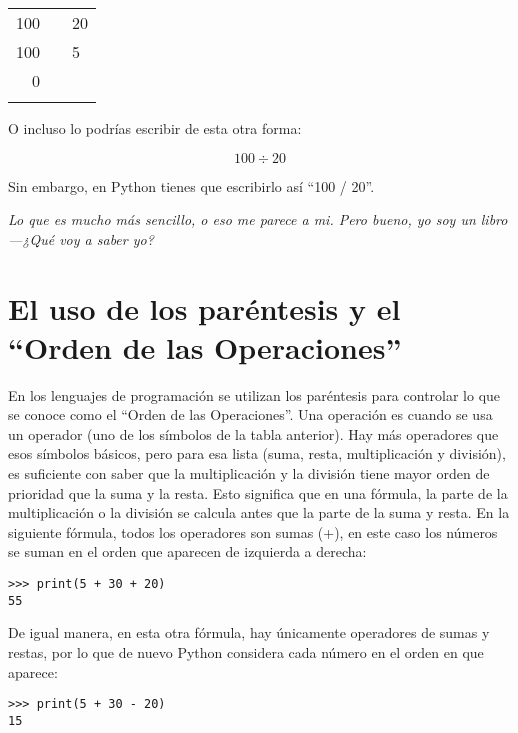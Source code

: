 \begin{center}
\begin{tabular}{rr|l}
100& &20\\
\cline{3-3}
100& &5\\
\cline{1-1}
0& &\\
 & & 
\end{tabular}
\end{center}

O incluso lo podrías escribir de esta otra forma:

\begin{displaymath}
100 \div 20
\end{displaymath}

Sin embargo, en Python tienes que escribirlo así ``100 / 20''.

\emph{Lo que es mucho más sencillo, o eso me parece a mi.  Pero bueno, yo soy un libro---¿Qué voy a saber yo?}

\section{El uso de los paréntesis y el ``Orden de las Operaciones''}

En los lenguajes de programación se utilizan los paréntesis para controlar lo que se conoce como el ``Orden de las Operaciones''.  Una operación es cuando se usa un operador (uno de los símbolos de la tabla anterior).  Hay más operadores que esos símbolos básicos, pero para esa lista (suma, resta, multiplicación y división), es suficiente con saber que la multiplicación y la división tiene mayor orden de prioridad que la suma y la resta. Esto significa que en una fórmula, la parte de la multiplicación o la división se calcula antes que la parte de la suma y resta.  En la siguiente fórmula, todos los operadores son sumas (+), en este caso los números se suman en el orden que aparecen de izquierda a derecha:

\begin{listing}
\begin{verbatim}
>>> print(5 + 30 + 20)
55
\end{verbatim}
\end{listing}

\noindent
De igual manera, en esta otra fórmula, hay únicamente operadores de sumas y restas, por lo que de nuevo Python considera cada número en el orden en que aparece:

\begin{listing}
\begin{verbatim}
>>> print(5 + 30 - 20)
15
\end{verbatim}
\end{listing}


